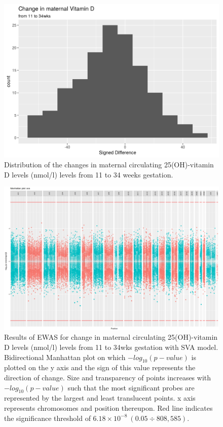\documentclass[
]{book}
\begin{document}
\begin{figure}

{\centering \includegraphics[width=0.8\linewidth]{figs/MAVIDOSdifVD} 

}

\caption{Distribution of the changes in maternal circulating 25(OH)-vitamin D levels (nmol/l) levels from 11 to 34 weeks gestation.}\label{fig:MAVIDOSdifVD}
\end{figure}



\begin{figure}

{\centering \includegraphics[width=0.8\linewidth]{figs/MAVIDOSdifVDEPICewasManhattanSVA} 

}

\caption{Results of EWAS for change in maternal circulating 25(OH)-vitamin D levels (nmol/l) levels from 11 to 34wks gestation with SVA model. Bidirectional Manhattan plot on which \(-log_{10}(p-value)\) is plotted on the y axis and the sign of this value represents the direction of change. Size and transparency of points increases with \(-log_{10}(p-value)\) such that the most significant probes are represented by the largest and least translucent points. x axis represents chromosomes and position thereupon. Red line indicates the significance threshold of \(6.18\times10^{-8}~(0.05\div808,585)\).}\label{fig:MAVIDOSdifVDEPICewasManhattanSVA}
\end{figure}
\end{document}

